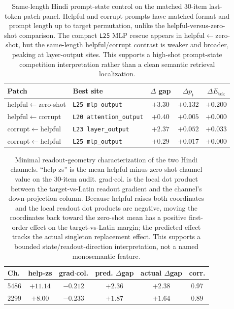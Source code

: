 \documentclass{article}
\begin{document}
\begin{table}[t]
\centering
\small
\setlength{\tabcolsep}{5pt}
\begin{tabular}{llccc}
\toprule
\textbf{Patch} & \textbf{Best site} & \textbf{$\Delta$ gap} & \textbf{$\Delta p_t$} & \textbf{$\Delta E_{\mathrm{tok}}$} \\
\midrule
helpful$\leftarrow$zero-shot & \texttt{L25 mlp\_output} & $+3.30$ & $+0.132$ & $+0.200$ \\
helpful$\leftarrow$corrupt & \texttt{L20 attention\_output} & $+0.40$ & $+0.005$ & $+0.000$ \\
corrupt$\leftarrow$helpful & \texttt{L23 layer\_output} & $+2.37$ & $+0.052$ & $+0.033$ \\
corrupt$\leftarrow$helpful & \texttt{L25 mlp\_output} & $+0.29$ & $+0.017$ & $+0.000$ \\
\bottomrule
\end{tabular}
\caption{Same-length Hindi prompt-state control on the matched 30-item last-token patch panel. Helpful and corrupt prompts have matched format and prompt length up to target permutation, unlike the helpful-versus-zero-shot comparison. The compact \texttt{L25} MLP rescue appears in helpful$\leftarrow$zero-shot, but the same-length helpful/corrupt contrast is weaker and broader, peaking at layer-output sites. This supports a high-shot prompt-state competition interpretation rather than a clean semantic retrieval localization.}
\label{tab:hindi_same_length}
\end{table}

\begin{table}[t]
\centering
\small
\setlength{\tabcolsep}{6pt}
\begin{tabular}{lccccc}
\toprule
\textbf{Ch.} & \textbf{help-zs} & \textbf{grad$\cdot$col.} & \textbf{pred. $\Delta$gap} & \textbf{actual $\Delta$gap} & \textbf{corr.} \\
\midrule
5486 & $+11.14$ & $-0.212$ & $+2.36$ & $+2.38$ & 0.97 \\
2299 & $+8.00$  & $-0.233$ & $+1.87$ & $+1.64$ & 0.89 \\
\bottomrule
\end{tabular}
\caption{Minimal readout-geometry characterization of the two Hindi channels. ``help-zs'' is the mean helpful-minus-zero-shot channel value on the 30-item audit. grad$\cdot$col. is the local dot product between the target-vs-Latin readout gradient and the channel's down-projection column. Because helpful raises both coordinates and the local readout dot products are negative, moving the coordinates back toward the zero-shot mean has a positive first-order effect on the target-vs-Latin margin; the predicted effect tracks the actual singleton replacement effect. This supports a bounded state/readout-direction interpretation, not a named monosemantic feature.}
\label{tab:hindi_channel_readout}
\end{table}
\end{document}
